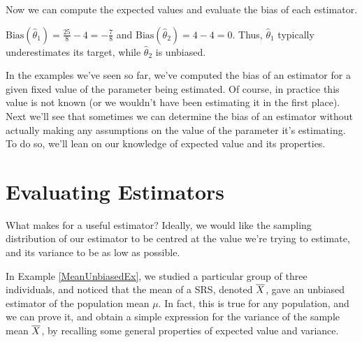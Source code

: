 \begin{examp}
\par
\noindent Now we can compute the expected values and evaluate the bias of each estimator.
\par
\noindent $\text{Bias}(\widehat{\theta}_1) = \frac{25}{8} - 4 = -\frac{7}{8}$ and $\text{Bias}(\widehat{\theta}_2) = 4 - 4 = 0$. Thus, $\widehat{\theta}_1$ typically underestimates its target, while $\widehat{\theta}_2$ is unbiased.
\end{examp}

\par
In the examples we've seen so far, we've computed the bias of an estimator for a given fixed value of the parameter being estimated. Of course, in practice this value is not known (or we wouldn't have been estimating it in the first place). Next we'll see that sometimes we can determine the bias of an estimator without actually making any assumptions on the value of the parameter it's estimating. To do so, we'll lean on our knowledge of expected value and its properties.

\section{Evaluating Estimators}

What makes for a useful estimator? Ideally, we would like the sampling distribution of our estimator to be centred at the value we're trying to estimate, and its variance to be as low as possible.

In Example \ref{MeanUnbiasedEx}, we studied a particular group of three individuals, and noticed that the mean of a SRS, denoted ${\overline{X}}$, gave an unbiased estimator of the population mean $\mu$. In fact, this is true for any population, and we can prove it, and obtain a simple expression for the variance of the sample mean ${\overline{X}}$, by recalling some general properties of expected value and variance.

